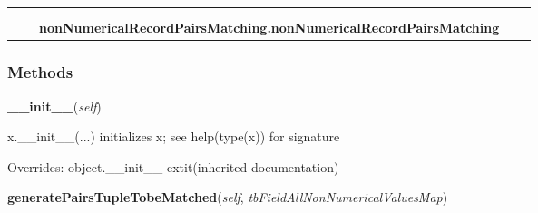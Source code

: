     \label{nonNumericalRecordPairsMatching:nonNumericalRecordPairsMatching}
\begin{tabular}{cccccc}
\multicolumn{2}{r}{\settowidth{\BCL}{object}\multirow{2}{\BCL}{object}}
&&
  \\\cline{3-3}
  &&\multicolumn{1}{c|}{}
&&
  \\
&&\multicolumn{2}{l}{\textbf{nonNumericalRecordPairsMatching.nonNumericalRecordPairsMatching}}
\end{tabular}



  \subsubsection{Methods}

    \vspace{0.5ex}

\hspace{.8\funcindent}\begin{boxedminipage}{\funcwidth}

    \raggedright \textbf{\_\_init\_\_}(\textit{self})

\setlength{\parskip}{2ex}
    x.\_\_init\_\_(...) initializes x; see help(type(x)) for signature

\setlength{\parskip}{1ex}
      Overrides: object.\_\_init\_\_ 	extit{(inherited documentation)}

    \end{boxedminipage}

    \label{nonNumericalRecordPairsMatching:nonNumericalRecordPairsMatching:generatePairsTupleTobeMatched}

    \vspace{0.5ex}

\hspace{.8\funcindent}\begin{boxedminipage}{\funcwidth}

    \raggedright \textbf{generatePairsTupleTobeMatched}(\textit{self}, \textit{tbFieldAllNonNumericalValuesMap})

\setlength{\parskip}{2ex}
\setlength{\parskip}{1ex}
    \end{boxedminipage}

